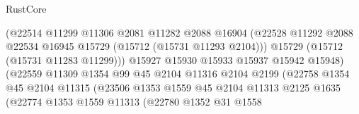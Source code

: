\begin{lexlean}{RustCore}
\begin{coremodule}
                                        (@22514
                                          @11299
                                          @11306
                                          @2081
                                          @11282
                                          @2088
                                          @16904
                                          (@22528
                                            @11292
                                            @2088
                                            @22534
                                            @16945
                                            @15729
                                            (@15712 (@15731 @11293 @2104)))
                                          @15729
                                          (@15712 (@15731 @11283 @11299)))
                                        @15927
                                        @15930
                                        @15933
                                        @15937
                                        @15942
                                        @15948)
                                      (@22559
                                        @11309
                                        @1354
                                        @99
                                        @45
                                        @2104
                                        @11316
                                        @2104
                                        @2199
                                        (@22758
                                          @1354
                                          @45
                                          @2104
                                          @11315
                                          (@23506
                                            @1353
                                            @1559
                                            @45
                                            @2104
                                            @11313
                                            @2125
                                            @1635
                                            (@22774
                                              @1353
                                              @1559
                                              @11313
                                              (@22780
                                                @1352
                                                @31
                                                @1558

\end{coremodule}
\end{lexlean}
